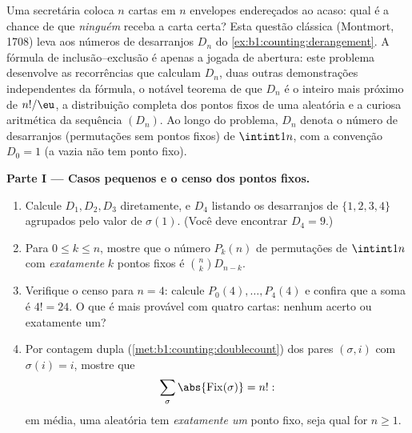 \begin{problem}\label{pb:b1:counting:1}
Uma secretária coloca $n$ cartas em $n$ envelopes endereçados ao acaso:
qual é a chance de que \emph{ninguém} receba a carta certa?
Esta questão clássica (Montmort, 1708) leva aos números de desarranjos
$D_n$ do \cref{ex:b1:counting:derangement}. A fórmula de
inclusão--exclusão é apenas a jogada de abertura: este problema
desenvolve as recorrências que calculam $D_n$, duas outras demonstrações
independentes da fórmula, o notável teorema de que $D_n$ é o inteiro
mais próximo de $n!/\eu$, a distribuição completa dos pontos fixos de
uma  aleatória e a curiosa aritmética da sequência
$(D_n)$.
Ao longo do problema, $D_n$ denota o número de desarranjos (permutações
sem pontos fixos) de $\intint1n$, com a convenção $D_0 = 1$
(a  vazia não tem ponto fixo).

\medskip
\noindent\textbf{Parte I --- Casos pequenos e o censo dos pontos
fixos.}
\begin{enumerate}
  \item Calcule $D_1, D_2, D_3$ diretamente, e $D_4$ listando os
        desarranjos de $\{1, 2, 3, 4\}$ agrupados pelo valor de
        $\sigma(1)$. (Você deve encontrar $D_4 = 9$.)
  \item Para $0 \leq k \leq n$, mostre que o número $P_k(n)$ de
        permutações de $\intint1n$ com \emph{exatamente} $k$ pontos
        fixos é $\binom nk D_{n-k}$.
  \item Verifique o censo para $n = 4$: calcule $P_0(4), \dots,
        P_4(4)$ e confira que a soma é $4! = 24$. O que é mais
        provável com quatro cartas: nenhum acerto ou exatamente um?
  \item Por contagem dupla (\cref{met:b1:counting:doublecount})
        dos pares $(\sigma, i)$ com $\sigma(i) = i$, mostre que
        \[
        \sum_{\sigma} \abs{\mathrm{Fix}(\sigma)} = n! :
        \]
        em média, uma  aleatória tem \emph{exatamente um}
        ponto fixo, seja qual for $n \geq 1$.
\end{enumerate}


\end{problem}
